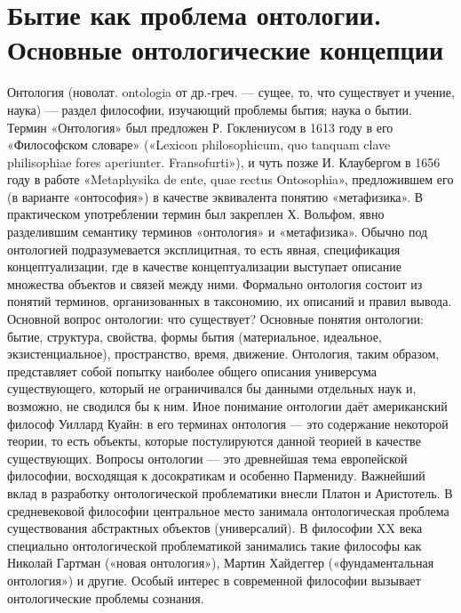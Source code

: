 \documentclass[12pt]{article}
\begin{document}
\section{Бытие как проблема онтологии. Основные онтологические концепции}
Онтология (новолат. ontologia от др.-греч. — сущее, то, что существует и учение, наука) — раздел философии,
изучающий проблемы бытия; наука о бытии.
Термин «Онтология» был предложен Р. Гоклениусом в 1613 году в его «Философском словаре» («Lexicon
philosophicum, quo tanquam clave philisophiae fores aperiunter. Fransofurti»), и чуть позже И. Клаубергом в 1656
году в работе «Metaphysika de ente, quae rectus Ontosophia», предложившем его (в варианте «онтософия») в
качестве  эквивалента  понятию  «метафизика».  В  практическом  употреблении  термин  был  закреплен  Х.
Вольфом, явно разделившим семантику терминов «онтология» и «метафизика».
Обычно под онтологией подразумевается эксплицитная, то есть явная, спецификация концептуализации, где в
качестве  концептуализации  выступает  описание  множества  объектов  и  связей  между  ними.  Формально
онтология состоит из понятий терминов, организованных в таксономию, их описаний и правил вывода.
Основной вопрос онтологии: что существует?
Основные  понятия  онтологии:  бытие,  структура,  свойства,  формы  бытия  (материальное,  идеальное,
экзистенциальное), пространство, время, движение.
Онтология,  таким  образом,  представляет  собой  попытку  наиболее  общего  описания  универсума
существующего, который не ограничивался бы данными отдельных наук и, возможно, не сводился бы к ним.
Иное понимание онтологии даёт американский философ Уиллард Куайн: в его терминах онтология — это
содержание  некоторой  теории,  то  есть  объекты,  которые  постулируются  данной  теорией  в  качестве
существующих.
Вопросы онтологии — это древнейшая тема европейской философии, восходящая к досократикам и особенно
Пармениду. Важнейший вклад в разработку онтологической проблематики внесли Платон и Аристотель. В
средневековой философии центральное место занимала онтологическая проблема существования абстрактных
объектов (универсалий).
В философии XX века специально онтологической проблематикой занимались такие философы как Николай
Гартман («новая онтология»), Мартин Хайдеггер («фундаментальная онтология») и другие. Особый интерес в
современной философии вызывает онтологические проблемы сознания.
\end{document}
